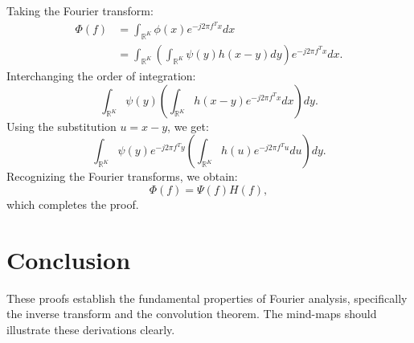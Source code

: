 \documentclass{article}
\begin{document}
Taking the Fourier transform:
\begin{align*}
    \Phi(f) &= \int_{\mathbb{R}^K} \phi(x) e^{-j 2\pi f^T x} dx \\
    &= \int_{\mathbb{R}^K} \left( \int_{\mathbb{R}^K} \psi(y) h(x-y) dy \right) e^{-j 2\pi f^T x} dx.
\end{align*}
Interchanging the order of integration:
\begin{equation}
    \int_{\mathbb{R}^K} \psi(y) \left( \int_{\mathbb{R}^K} h(x-y) e^{-j 2\pi f^T x} dx \right) dy.
\end{equation}
Using the substitution $u = x - y$, we get:
\begin{equation}
    \int_{\mathbb{R}^K} \psi(y) e^{-j 2\pi f^T y} \left( \int_{\mathbb{R}^K} h(u) e^{-j 2\pi f^T u} du \right) dy.
\end{equation}
Recognizing the Fourier transforms, we obtain:
\begin{equation}
    \Phi(f) = \Psi(f) H(f),
\end{equation}
which completes the proof.

\section{Conclusion}
These proofs establish the fundamental properties of Fourier analysis, specifically the inverse transform and the convolution theorem. The mind-maps should illustrate these derivations clearly.
\end{document}
